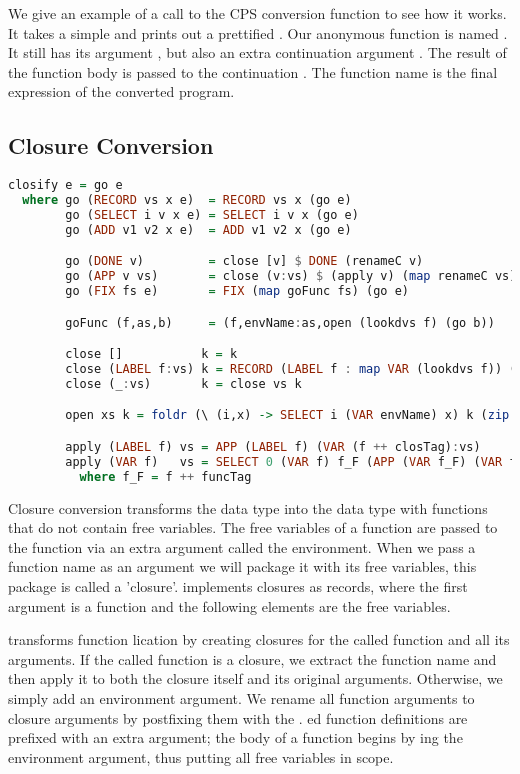 We give an example of a call to the \ac{CPS} conversion function to see how it works. It takes a simple  and prints out a prettified . Our anonymous function is named . It still has its argument , but also an extra continuation argument . The result of the function body is passed to the continuation . The function name is the final expression of the converted program.

\subsection{\label{section:closconvert}Closure Conversion}
\begin{lstlisting}[language=Haskell]
closify e = go e
  where go (RECORD vs x e)  = RECORD vs x (go e)
        go (SELECT i v x e) = SELECT i v x (go e)
        go (ADD v1 v2 x e)  = ADD v1 v2 x (go e)

        go (DONE v)         = close [v] $ DONE (renameC v)
        go (APP v vs)       = close (v:vs) $ (apply v) (map renameC vs)
        go (FIX fs e)       = FIX (map goFunc fs) (go e)

        goFunc (f,as,b)     = (f,envName:as,open (lookdvs f) (go b))

        close []           k = k
        close (LABEL f:vs) k = RECORD (LABEL f : map VAR (lookdvs f)) (f ++ closTag) (close vs k)
        close (_:vs)       k = close vs k

        open xs k = foldr (\ (i,x) -> SELECT i (VAR envName) x) k (zip [1..] xs)

        apply (LABEL f) vs = APP (LABEL f) (VAR (f ++ closTag):vs)
        apply (VAR f)   vs = SELECT 0 (VAR f) f_F (APP (VAR f_F) (VAR f:vs))
          where f_F = f ++ funcTag
\end{lstlisting}

Closure conversion transforms the  data type into the  data type with functions that do not contain free variables. The free variables of a function are passed to the function via an extra argument called the environment. When we pass a function name as an argument we will package it with its free variables, this package is called a 'closure'.  implements closures as records, where the first argument is a function  and the following elements are the free variables.

 transforms function lication by creating closures for the called function and all its arguments. If the called function is a closure, we extract the function name and then apply it to both the closure itself and its original arguments. Otherwise, we simply add an environment argument. We rename all function arguments to closure arguments by postfixing them with the . ed function definitions are prefixed with an extra  argument; the body of a function begins by ing the environment argument, thus putting all free variables in scope.

